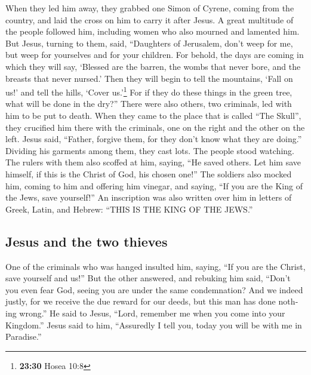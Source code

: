 \begin{paracol}{2}
\begin{otherlanguage}{english}
\begin{otherlanguage}{english}
 When they led him away, they grabbed one Simon of
Cyrene, coming from the country, and laid the cross on him to carry it
after Jesus.  A great multitude of the people followed
him, including women who also mourned and lamented him. 
But Jesus, turning to them, said, ``Daughters of Jerusalem, don't weep
for me, but weep for yourselves and for your children. 
For behold, the days are coming in which they will say, `Blessed are the
barren, the wombs that never bore, and the breasts that never nursed.'
 Then they will begin to tell the mountains, `Fall on
us!' and tell the hills, `Cover us.'\footnote{\textbf{23:30} Hosea 10:8}
 For if they do these things in the green tree, what will
be done in the dry?''  There were also others, two
criminals, led with him to be put to death.  When they
came to the place that is called ``The Skull'', they crucified him there
with the criminals, one on the right and the other on the left.
 Jesus said, ``Father, forgive them, for they don't know
what they are doing.'' Dividing his garments among them, they cast lots.
 The people stood watching. The rulers with them also
scoffed at him, saying, ``He saved others. Let him save himself, if this
is the Christ of God, his chosen one!''  The soldiers
also mocked him, coming to him and offering him vinegar, 
and saying, ``If you are the King of the Jews, save yourself!''
 An inscription was also written over him in letters of
Greek, Latin, and Hebrew: ``THIS IS THE KING OF THE JEWS.''

\hypertarget{jesus-and-the-two-thieves}{%
\subsection{Jesus and the two thieves}\label{jesus-and-the-two-thieves}}

 One of the criminals who was hanged insulted him,
saying, ``If you are the Christ, save yourself and us!'' 
But the other answered, and rebuking him said, ``Don't you even fear
God, seeing you are under the same condemnation?  And we
indeed justly, for we receive the due reward for our deeds, but this man
has done nothing wrong.''  He said to Jesus, ``Lord,
remember me when you come into your Kingdom.''  Jesus
said to him, ``Assuredly I tell you, today you will be with me in
Paradise.''


\end{otherlanguage}
\end{otherlanguage}
\end{paracol}
